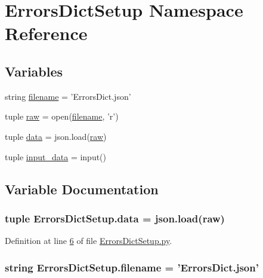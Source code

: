 \hypertarget{namespace_errors_dict_setup}{\section{Errors\-Dict\-Setup Namespace Reference}
\label{namespace_errors_dict_setup}
}
\subsection*{Variables}
\begin{DoxyCompactItemize}
\item 
string \hyperlink{namespace_errors_dict_setup_a0c97c48fca0fdec3e730b9df1dbab9c7}{filename} = 'Errors\-Dict.\-json'
\item 
tuple \hyperlink{namespace_errors_dict_setup_ad08a9cc68898a62eb6523550f54917cf}{raw} = open(\hyperlink{namespace_errors_dict_setup_a0c97c48fca0fdec3e730b9df1dbab9c7}{filename}, 'r')
\item 
tuple \hyperlink{namespace_errors_dict_setup_adf4c30d205d29df7343e26f7c62b0685}{data} = json.\-load(\hyperlink{namespace_errors_dict_setup_ad08a9cc68898a62eb6523550f54917cf}{raw})
\item 
tuple \hyperlink{namespace_errors_dict_setup_a27081bed64a1fae4487e33cd53862a6f}{input\-\_\-data} = input()
\end{DoxyCompactItemize}


\subsection{Variable Documentation}
\hypertarget{namespace_errors_dict_setup_adf4c30d205d29df7343e26f7c62b0685}{
\subsubsection[{data}]{\setlength{\rightskip}{0pt plus 5cm}tuple Errors\-Dict\-Setup.\-data = json.\-load({\bf raw})}}\label{namespace_errors_dict_setup_adf4c30d205d29df7343e26f7c62b0685}


Definition at line \hyperlink{_errors_dict_setup_8py_source_l00006}{6} of file \hyperlink{_errors_dict_setup_8py_source}{Errors\-Dict\-Setup.\-py}.

\hypertarget{namespace_errors_dict_setup_a0c97c48fca0fdec3e730b9df1dbab9c7}{
\subsubsection[{filename}]{\setlength{\rightskip}{0pt plus 5cm}string Errors\-Dict\-Setup.\-filename = 'Errors\-Dict.\-json'}}\label{namespace_errors_dict_setup_a0c97c48fca0fdec3e730b9df1dbab9c7}



